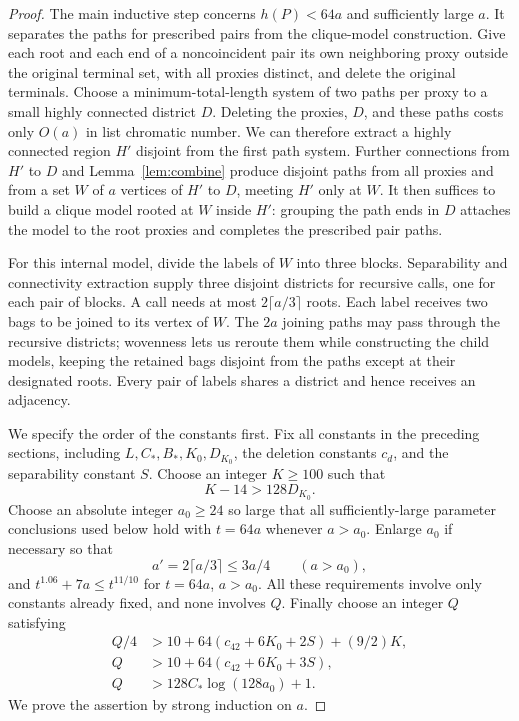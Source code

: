 \begin{proof}
The main inductive step concerns $h(P)<64a$ and sufficiently large $a$.
It separates the paths for prescribed pairs from the clique-model
construction. Give each root and each end of a noncoincident pair its
own neighboring proxy outside the original terminal set, with all proxies
distinct, and delete the original terminals. Choose a minimum-total-length
system of two paths per proxy to a small highly connected district $D$.
Deleting the proxies, $D$, and these paths costs only $O(a)$ in list
chromatic number. We can therefore extract a highly connected region
$H'$ disjoint from the first path system. Further connections
from $H'$ to $D$ and Lemma~\ref{lem:combine} produce disjoint paths from
all proxies and from a set $W$ of $a$ vertices of $H'$ to $D$, meeting
$H'$ only at $W$. It then suffices to build a clique model rooted at $W$
inside $H'$: grouping the path ends in $D$ attaches the model to the
root proxies and completes the prescribed pair paths.

For this internal model, divide the labels of $W$ into three blocks.
Separability and connectivity extraction supply three disjoint
districts for recursive calls, one for each pair of blocks. A call
needs at most $2\lceil a/3\rceil$ roots. Each label receives two bags
to be joined to its vertex of $W$. The $2a$ joining paths may pass through
the recursive districts; wovenness lets us reroute them while constructing
the child models, keeping the retained bags disjoint from the paths
except at their designated roots. Every pair of labels shares a district
and hence receives an adjacency.

We specify the order of the constants first. Fix all constants in the
preceding sections, including $L,C_*,B_*,K_0,D_{K_0}$, the deletion
constants $c_d$, and the separability constant $S$. Choose an integer
$K\ge100$ such that
\begin{equation}\label{recursive:K}
 K-14>128D_{K_0}.
\end{equation}
Choose an absolute integer $a_0\ge24$ so large that all sufficiently-large
parameter conclusions used below hold with $t=64a$ whenever $a>a_0$.
Enlarge $a_0$ if necessary so that
\begin{equation}\label{recursive:shrink}
 a'=2\lceil a/3\rceil\le3a/4\qquad(a>a_0),
\end{equation}
and $t^{1.06}+7a\le t^{11/10}$ for $t=64a$, $a>a_0$.
All these requirements involve only constants already fixed, and none
involves $Q$. Finally choose an integer $Q$ satisfying
\begin{align}
 Q/4&>10+64(c_{42}+6K_0+2S)+(9/2)K,
       \label{recursive:Q-induction}\\
 Q&>10+64(c_{42}+6K_0+3S),
       \label{recursive:Q-separation}\\
 Q&>128C_*\log(128a_0)+1.
       \label{recursive:Q-base}
\end{align}
We prove the assertion by strong induction on $a$.


\end{proof}
